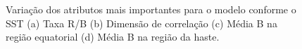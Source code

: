 \begin{figure}[H]
\centering
	\caption{Variação dos atributos mais importantes para o modelo conforme o SST (a) Taxa R/B (b) Dimensão de correlação (c) Média B na região equatorial (d) Média B na região da haste.}

\end{figure}
